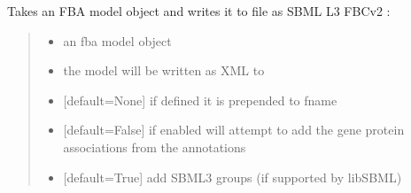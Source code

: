 \documentclass[letterpaper,12pt,english]{sphinxmanual}
\begin{document}
\begin{fulllineitems}

\pysigstartsignatures
\pysiglinewithargsret
{}
{\sphinxparamcomma {}\sphinxparamcomma {}\sphinxparamcomma {}\sphinxparamcomma {}\sphinxparamcomma {}\sphinxparamcomma {}\sphinxparamcomma {}\sphinxparamcomma {}\sphinxparamcomma {}\sphinxparamcomma {}}
{}
\pysigstopsignatures
\sphinxAtStartPar
Takes an FBA model object and writes it to file as SBML L3 FBCv2 :
\begin{quote}\begin{description}
\begin{itemize}
\item {} 
\sphinxAtStartPar
{} \textendash{} an fba model object

\item {} 
\sphinxAtStartPar
{} \textendash{} the model will be written as XML to 

\item {} 
\sphinxAtStartPar
{} \textendash{} {[}default=None{]} if defined it is prepended to fname

\item {} 
\sphinxAtStartPar
{} \textendash{} {[}default=False{]} if enabled will attempt to add the gene protein associations from the annotations

\item {} 
\sphinxAtStartPar
{} \textendash{} {[}default=True{]} add SBML3 groups (if supported by libSBML)


\end{itemize}
\end{description}
\end{quote}
\end{fulllineitems}
\end{document}
